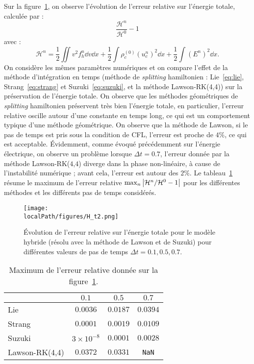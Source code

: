 Sur la figure~\ref{fig:H:t2}, on observe l'évolution de l'erreur relative sur l'énergie totale, calculée par :
\begin{equation}
	\frac{\mathcal{H}^n}{\mathcal{H}^0}-1
	\label{eq:relativeerror:H}
\end{equation}
avec :
$$
  \mathcal{H}^n = \frac{1}{2}\iint v^2f_h^n\dd{v}\dd{x}
                + \frac{1}{2}\int\rho_c^{(0)}\left(u_c^n\right)^2\dd{x}
                + \frac{1}{2}\int\left(E^n\right)^2\dd{x}.
$$
On considère les mêmes paramètres numériques et on compare l'effet de la méthode d'intégration en temps (méthode de \emph{splitting} hamiltonien : Lie~\eqref{eq:lie}, Strang~\eqref{eq:strang} et Suzuki~\eqref{eq:suzuki}, et la méthode Lawson-RK(4,4)) sur la préservation de l'énergie totale. On observe que les méthodes géométriques de \emph{splitting} hamiltonien préservent très bien l'énergie totale, en particulier, l'erreur relative oscille autour d'une constante en temps long, ce qui est un comportement typique d'une méthode géométrique. On observe que la méthode de Lawson, si le pas de temps est pris sous la condition de CFL, l'erreur est proche de $4\%$, ce qui est acceptable. Évidemment, comme évoqué précédemment sur l'énergie électrique, on observe un problème lorsque $\Delta t=0.7$, l'erreur donnée par la méthode Lawson-RK($4$,$4$) diverge dans la phase non-linéaire, à cause de l'instabilité numérique ; avant cela, l'erreur est autour des $2\%$. Le tableau~\ref{tab:H:max} résume le maximum de l'erreur relative $\max_n \left| {\cal H}^n / {\cal H}^0 -1 \right|$ pour les différentes méthodes et les différents pas de temps considérés.

\begin{figure}[h]
  \centering
  \texttt{[image: \\localPath/figures/H\_t2.png]}
  \caption{Évolution de l'erreur relative sur l'énergie totale pour le modèle hybride (résolu avec la méthode de Lawson et de Suzuki) pour différentes valeurs de pas de temps $\Delta t=0.1,0.5,0.7$.}
  \label{fig:H:t2}
\end{figure}

\begin{table}[h]
  \centering
  \begin{tabular}{l|c|c|c}
                   & $0.1$             & $0.5$     & $0.7$        \\
    \hline
    Lie            & $0.0036$          & $0.0187$  & $0.0394$     \\
    Strang         & $0.0001$          & $0.0019$  & $0.0109$     \\
    Suzuki         & $3\times 10^{-8}$ & $0.0001$  & $0.0028$     \\
    Lawson-RK(4,4) & $0.0372$          & $0.0331$  & \texttt{NaN} \\
  \end{tabular}
  \caption{Maximum de l'erreur relative donnée sur la figure~\ref{fig:H:t2}.}
  \label{tab:H:max}
\end{table}

